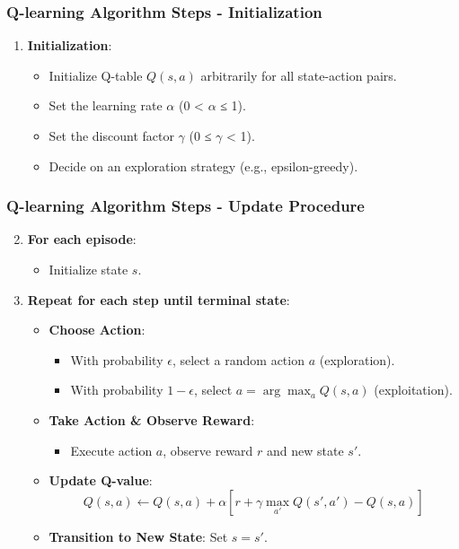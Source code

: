 \documentclass{beamer}
\begin{document}
\begin{frame}[fragile]
    \frametitle{Q-learning Algorithm Steps - Initialization}
    \begin{enumerate}
        \item \textbf{Initialization}: 
        \begin{itemize}
            \item Initialize Q-table \( Q(s, a) \) arbitrarily for all state-action pairs.
            \item Set the learning rate \( \alpha \) (0 < \( \alpha \) ≤ 1).
            \item Set the discount factor \( \gamma \) (0 ≤ \( \gamma \) < 1).
            \item Decide on an exploration strategy (e.g., epsilon-greedy).
        \end{itemize}
    \end{enumerate}
\end{frame}

\begin{frame}[fragile]
    \frametitle{Q-learning Algorithm Steps - Update Procedure}
    \begin{enumerate}
        \setcounter{enumi}{1}  %
        \item \textbf{For each episode}:
        \begin{itemize}
            \item Initialize state \( s \).
        \end{itemize}
        
        \item \textbf{Repeat for each step until terminal state}:
        \begin{itemize}
            \item \textbf{Choose Action}: 
            \begin{itemize}
                \item With probability \( \epsilon \), select a random action \( a \) (exploration).
                \item With probability \( 1 - \epsilon \), select \( a = \arg\max_a Q(s, a) \) (exploitation).
            \end{itemize}
            \item \textbf{Take Action \& Observe Reward}:
            \begin{itemize}
                \item Execute action \( a \), observe reward \( r \) and new state \( s' \).
            \end{itemize}
            \item \textbf{Update Q-value}: 
            \begin{equation}
            Q(s, a) \leftarrow Q(s, a) + \alpha \left[ r + \gamma \max_{a'} Q(s', a') - Q(s, a)\right]
            \end{equation}
            \item \textbf{Transition to New State}: Set \( s = s' \).
        \end{itemize}
    \end{enumerate}
\end{frame}
\end{document}
